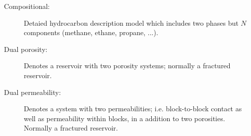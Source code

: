 \begin{description}
  \item[Compositional:] Detaied hydrocarbon description model which includes two phases but $N$ components (methane, ethane, propane, ...).
  \item[Dual porosity:] Denotes a reservoir with two porosity systems; normally a fractured reservoir.
  \item[Dual permeability:] Denotes a system with two permeabilities; i.e. block-to-block contact as well as permeability within blocks, in a addition to two porosities. Normally a fractured reservoir.
\end{description}

